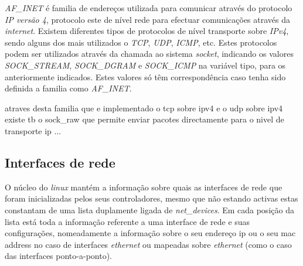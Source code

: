 \textit{AF\_INET} é familia de endereços utilizada para comunicar através do protocolo \textit{IP versão 4}, protocolo este de nível rede para efectuar comunicações através da \textit{internet}.
Existem diferentes tipos de protocolos de nível transporte sobre \textit{IPv4}, sendo alguns dos mais utilizados o \textit{TCP}, \textit{UDP}, \textit{ICMP}, etc.
Estes protocolos podem ser utilizados através da chamada ao sistema \textit{socket}, indicando os valores \textit{SOCK\_STREAM}, \textit{SOCK\_DGRAM} e \textit{SOCK\_ICMP} na variável tipo, para os anteriormente indicados.
Estes valores só têm correspondência caso tenha sido definida a familia como \textit{AF\_INET}.


atraves desta familia que e implementado o tcp sobre ipv4 e o udp sobre ipv4 existe tb o sock\_raw que permite enviar pacotes directamente para o nivel de transporte ip ... 

% 
%						
%
% 

\subsection{Interfaces de rede}

O núcleo do \textit{linux} mantém a informação sobre quais as interfaces de rede que foram inicializadas pelos seus controladores, mesmo que não estando activas estas constantam de uma lista duplamente ligada de \textit{net\_devices}. 
 Em cada posição da lista está toda a informação referente a uma interface de rede e suas configurações, nomeadamente a informação sobre o seu endereço ip ou o seu mac address no caso de interfaces \textit{ethernet} ou mapeadas sobre \textit{ethernet} (como o caso das interfaces ponto-a-ponto).

